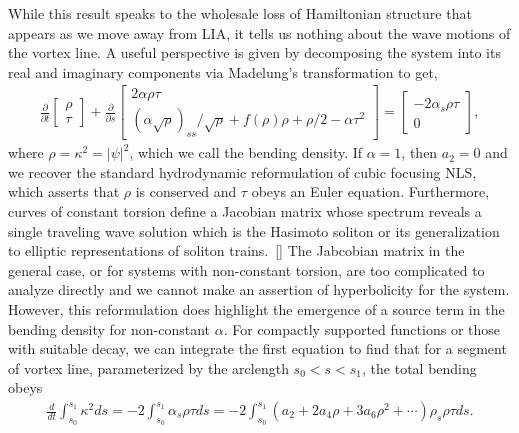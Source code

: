 \documentclass[aps,graphicx,reprint,onecolumn,12pt,tightenlines,longbibliography]{revtex4-1}
\newcommand{\sas}[2]{{#2}}
\begin{document}
While this result speaks to the wholesale loss of Hamiltonian structure that appears as we move away from LIA, it tells us nothing about the wave motions of the vortex line. A useful perspective is given by decomposing the system into its real and imaginary components via Madelung's transformation to get, 
%
\begin{align}\label{eqn:Conservation}
\displaystyle \frac{\partial}{\partial t}\begin{bmatrix}
\rho \\ \tau
\end{bmatrix}
+ \frac{\partial}{\partial s}\begin{bmatrix}
2\alpha \rho \tau  \\ 
\displaystyle \left( \alpha \sqrt{\rho}\right)_{ss}/\sqrt{\rho} + f(\rho)\rho + \rho/2 - \alpha \tau^{2} 
\end{bmatrix} = 
\begin{bmatrix}
-2 \alpha_{s} \rho \tau  \\ 0 
\end{bmatrix},
\end{align}
%
where $\rho = \kappa^{2} = |\psi|^{2}$, which we call the {bending density}. If $\alpha=1$, then $a_{2}=0$ and we recover the standard hydrodynamic reformulation of cubic focusing NLS, which asserts that $\rho$ is conserved and $\tau$ obeys an Euler equation. Furthermore, curves of constant torsion define a Jacobian matrix whose spectrum reveals a single traveling wave solution which is the Hasimoto soliton or its generalization to elliptic representations of soliton trains.~[] The Jabcobian matrix in the general case, or for systems with non-constant torsion, are too complicated to analyze directly and we cannot make an assertion of hyperbolicity for the system. However, this reformulation does highlight the emergence of a source term in the bending density for non-constant $\alpha$. For compactly supported functions or those with suitable decay, we can integrate the first equation to find that \sas{}{for a segment of vortex line, parameterized by the arclength $s_0<s<s_1$,} the total bending \sas{across the vortex line} obeys 
%
\begin{align}\label{eqn:totalBending1}
\frac{d}{dt}\int_{s_0}^{s_1} \kappa^{2}ds = -2 \int_{s_0}^{s_1} \alpha_{s} \rho \tau ds = -2 \int_{s_0}^{s_1} (a_{2}+2a_{4}\rho + 3 a_{6} \rho^{2} +\cdots )\rho_{s}\rho \tau ds . 
\end{align}
%
\end{document}
